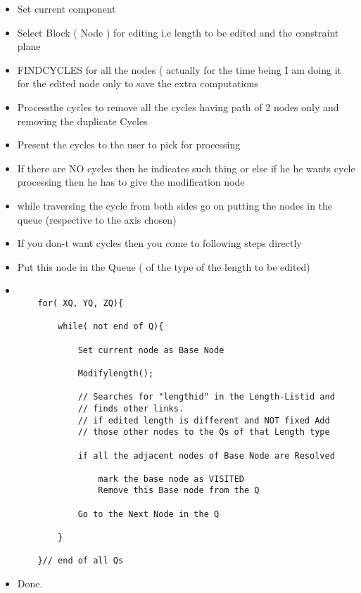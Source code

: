 	\begin{itemize}

	\item
   Set current component
	\item
   Select Block ( Node ) for editing
    i.e length to be edited and the constraint plane

	\item
   FINDCYCLES for all the nodes ( actually for the time being I am
    doing it for the edited node only to save the extra computations

	\item
   Processthe cycles to remove all the cycles having path of 2 nodes
    only and removing the duplicate Cycles

	\item
   Present the cycles to the user to pick for processing

	\item
   If there are NO cycles then he indicates such thing or else if he
    he wants cycle processing then he has to give the modification node

	\item
   while traversing the cycle from both sides go on putting the  nodes
    in the queue (respective to the axis chosen)

	\item
   If you don-t want cycles then you come to following steps directly

	\item
   Put this node in the Queue ( of the type of the length to be edited)

	\item
	
	\begin{verbatim}

    for( XQ, YQ, ZQ){

        while( not end of Q){

            Set current node as Base Node

            Modifylength();

            // Searches for "lengthid" in the Length-Listid and
            // finds other links.
            // if edited length is different and NOT fixed Add
            // those other nodes to the Qs of that Length type

            if all the adjacent nodes of Base Node are Resolved

                mark the base node as VISITED
                Remove this Base node from the Q

            Go to the Next Node in the Q

        }

    }// end of all Qs

	\end{verbatim}

	\item
   Done.

	\end{itemize}


